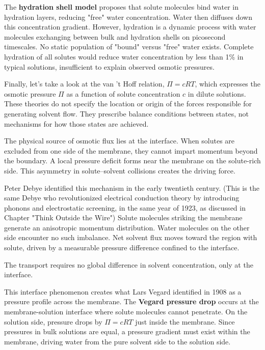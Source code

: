 The \textbf{hydration shell model} proposes that solute molecules bind water in hydration layers, reducing "free" water concentration. Water then diffuses down this concentration gradient. However, hydration is a dynamic process with water molecules exchanging between bulk and hydration shells on picosecond timescales. No static population of "bound" versus "free" water exists. Complete hydration of all solutes would reduce water concentration by less than 1\% in typical solutions, insufficient to explain observed osmotic pressures.

Finally, let's take a look at the van 't Hoff relation, $\Pi = cRT$, which expresses the osmotic pressure $\Pi$ as a function of solute concentration $c$ in dilute solutions. These theories do not specify the location or origin of the forces responsible for generating solvent flow. They prescribe balance conditions between states, not mechanisms for how those states are achieved.

The physical source of osmotic flux lies at the interface. When solutes are excluded from one side of the membrane, they cannot impart momentum beyond the boundary. A local pressure deficit forms near the membrane on the solute-rich side. This asymmetry in solute–solvent collisions creates the driving force.

Peter Debye identified this mechanism in the early twentieth century. (This is the same Debye who revolutionized electrical conduction theory by introducing phonons and electrostatic screening, in the same year of 1923, as discussed in Chapter "Think Outside the Wire") Solute molecules striking the membrane generate an anisotropic momentum distribution. Water molecules on the other side encounter no such imbalance. Net solvent flux moves toward the region with solute, driven by a measurable pressure difference confined to the interface.

The transport requires no global difference in solvent concentration, only at the interface.

This interface phenomenon creates what Lars Vegard identified in 1908 as a pressure profile across the membrane. The \textbf{Vegard pressure drop} occurs at the membrane-solution interface where solute molecules cannot penetrate. On the solution side, pressure drops by $\Pi = cRT$ just inside the membrane. Since pressures in bulk solutions are equal, a pressure gradient must exist within the membrane, driving water from the pure solvent side to the solution side.

